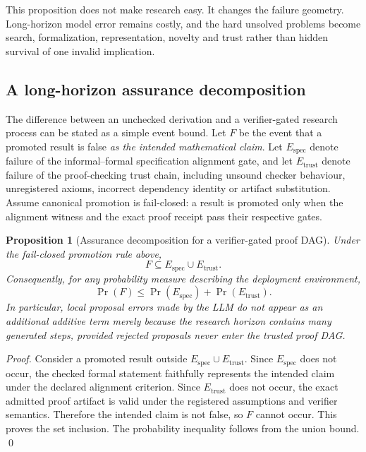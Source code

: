 \documentclass[11pt]{article}
\newtheorem{proposition}{Proposition}
\begin{document}
This proposition does not make research easy. It changes the failure geometry. Long-horizon model error remains costly, and the hard unsolved problems become search, formalization, representation, novelty and trust rather than hidden survival of one invalid implication.


\subsection{A long-horizon assurance decomposition}

The difference between an unchecked derivation and a verifier-gated research process can be stated as a simple event bound. Let $F$ be the event that a promoted result is false \emph{as the intended mathematical claim}. Let $E_{\mathrm{spec}}$ denote failure of the informal--formal specification alignment gate, and let $E_{\mathrm{trust}}$ denote failure of the proof-checking trust chain, including unsound checker behaviour, unregistered axioms, incorrect dependency identity or artifact substitution. Assume canonical promotion is fail-closed: a result is promoted only when the alignment witness and the exact proof receipt pass their respective gates.

\begin{proposition}[Assurance decomposition for a verifier-gated proof DAG]
Under the fail-closed promotion rule above,
\[
F\subseteq E_{\mathrm{spec}}\cup E_{\mathrm{trust}}.
\]
Consequently, for any probability measure describing the deployment environment,
\[
\Pr(F)\leq
\Pr(E_{\mathrm{spec}})+\Pr(E_{\mathrm{trust}}).
\]
In particular, local proposal errors made by the LLM do not appear as an additional additive term merely because the research horizon contains many generated steps, provided rejected proposals never enter the trusted proof DAG.
\end{proposition}

\begin{proof}
Consider a promoted result outside $E_{\mathrm{spec}}\cup E_{\mathrm{trust}}$. Since $E_{\mathrm{spec}}$ does not occur, the checked formal statement faithfully represents the intended claim under the declared alignment criterion. Since $E_{\mathrm{trust}}$ does not occur, the exact admitted proof artifact is valid under the registered assumptions and verifier semantics. Therefore the intended claim is not false, so $F$ cannot occur. This proves the set inclusion. The probability inequality follows from the union bound. \qed
\end{proof}
\end{document}

